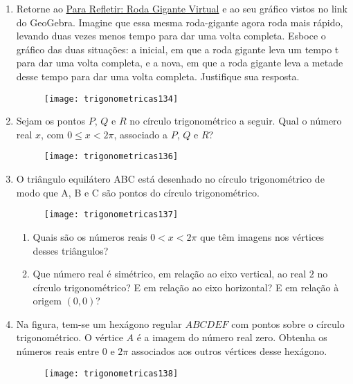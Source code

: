 \begin{enumerate}
\item Retorne ao \hyperref[trig-reflection1]{Para Refletir: Roda Gigante Virtual} e ao seu gráfico vistos no link do GeoGebra. Imagine que essa mesma roda-gigante agora roda mais rápido, levando duas vezes menos tempo para dar uma volta completa. Esboce o gráfico das duas situações: a inicial, em que a roda gigante leva um tempo t para dar uma volta completa, e a nova, em que a roda gigante leva a metade desse tempo para dar uma volta completa. Justifique sua resposta.

\begin{figure}[H]
\centering

\texttt{[image: trigonometricas134]}
\end{figure}

\item Sejam os pontos $P$, $Q$ e $R$ no círculo trigonométrico a seguir. Qual o número real $x$, com $0\leq x<2\pi$, associado a $P$, $Q$ e $R$?
\begin{figure}[H]
\centering

\texttt{[image: trigonometricas136]}
\end{figure}


\item O triângulo equilátero ABC está desenhado no círculo trigonométrico de modo que A, B e C são pontos do círculo trigonométrico.

\begin{figure}[H]
\centering

\texttt{[image: trigonometricas137]}
\end{figure}

\begin{enumerate}
\item Quais são os números reais $0<x<2\pi$ que têm imagens nos vértices desses triângulos?
\item Que número real é simétrico, em relação ao eixo vertical, ao real $2$ no círculo trigonométrico? E em relação ao eixo horizontal? E em relação à origem $(0,0)$?
\end{enumerate}


\item Na figura, tem-se um hexágono regular $ABCDEF$ com pontos sobre o círculo trigonométrico. O vértice $A$ é a imagem do número real zero. Obtenha os números reais entre $0$ e $2\pi$ associados aos outros vértices desse hexágono.

\begin{figure}[H]
\centering

\texttt{[image: trigonometricas138]}
\end{figure}
\end{enumerate}



